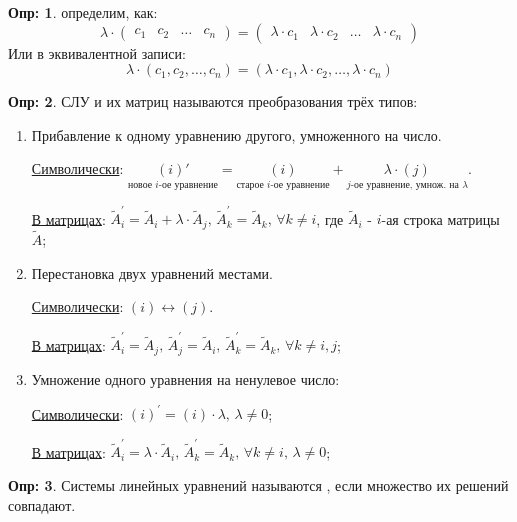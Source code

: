 \documentclass[12pt]{article}
\theoremstyle{definition}
\newtheorem{defn}{Опр:}
\newcommand{\wte}[1]{\widetilde{#1}}
\begin{document}
\begin{defn}
	 определим, как:
	$$
	\lambda{\cdot}\begin{pmatrix}
		c_1 & c_2 &\dotsc & c_n
	\end{pmatrix} =
	\begin{pmatrix}
		\lambda{\cdot} c_1 &\lambda{\cdot} c_2 &\dotsc &\lambda{\cdot} c_n 
	\end{pmatrix}
	$$
	Или в эквивалентной записи:
	$$
		\lambda{\cdot}(c_1, c_2, \dotsc, c_n) = (\lambda{\cdot}c_1, \lambda{\cdot}c_2, \dotsc, \lambda{\cdot}c_n)
	$$
\end{defn}

\begin{defn}
	 СЛУ и их матриц называются преобразования трёх типов:
	\begin{enumerate}[label=\arabic*)]
		\item Прибавление к одному уравнению другого, умноженного на число. 
		
		\uline{Символически}: $
			\underset{\text{новое }i\text{-ое уравнение}}{(i)'}= \underset{\text{старое }i\text{-ое уравнение}}{(i)} +  \underset{j\text{-ое уравнение, умнож. на }\lambda}{\lambda{\cdot}(j)}$.
			
		\uline{В матрицах}: $\wte{A}_i^{'} = \wte{A}_i + \lambda {\cdot}\wte{A}_j, \, \wte{A}_k^{'} = \wte{A}_k, \, \forall k \neq i$, где $\wte{A}_i$ - $i$-ая строка матрицы $\wte{A}$;
		\item Перестановка двух уравнений местами.
		
		\uline{Символически}: $(i) \longleftrightarrow (j)$.
		
		\uline{В матрицах}: $\wte{A}_i^{'} = \wte{A}_j, \, \wte{A}_j^{'} =\wte{A}_i, \, \wte{A}_k^{'} = \wte{A}_k, \, \forall k \neq i,j$;
		
		\item Умножение одного уравнения на ненулевое число:
		
		\uline{Символически}: $(i)^{'} = (i){\cdot}\lambda, \, \lambda \neq 0$;
		
		\uline{В матрицах}: $\wte{A}_i^{'} = \lambda{\cdot}\wte{A}_i, \, \wte{A}_k^{'} = \wte{A}_k, \, \forall k \neq i, \, \lambda \neq 0$;
	\end{enumerate}
\end{defn}

\begin{defn}
	Системы линейных уравнений называются , если множество их решений совпадают.
\end{defn}
\end{document}
